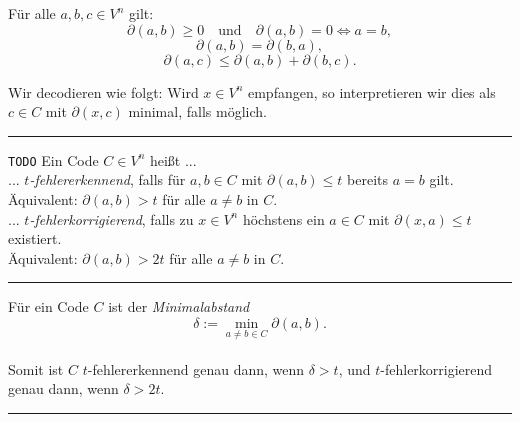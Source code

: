 \documentclass[9pt]{article}
\begin{document}
\begin{eig}
Für alle \(a, b, c \in V^n\) gilt: 
\[
\partial(a, b) \geq 0 \quad \text{und} \quad \partial(a, b) = 0 \iff a = b,
\]
\[
\partial(a, b) = \partial(b, a),
\]
\[
\partial(a, c) \leq \partial(a, b) + \partial(b, c).
\]

Wir decodieren wie folgt: Wird \(x \in V^n\) empfangen, so interpretieren wir dies als \(c \in C\) mit \(\partial(x, c)\) minimal, falls möglich. 
\end{eig} \noindent \rule{8cm}{0.4pt}

\begin{defi} \texttt{TODO} 
Ein Code \(C \in V^n\) heißt ... \\
... \emph{\(t\)-fehlererkennend}, falls für \(a, b \in C\) mit \(\partial(a, b) \leq t\) bereits \(a = b\) gilt. \\ Äquivalent: \(\partial(a, b) > t\) für alle \(a \neq b\) in \(C\). \\ \newline
... \emph{\(t\)-fehlerkorrigierend}, falls zu \(x \in V^n\) höchstens ein \(a \in C\) mit \(\partial(x, a) \leq t\)
existiert. \\Äquivalent: \(\partial(a, b) > 2t\) für alle \(a \neq b\) in \(C\).
\end{defi} \noindent \rule{8cm}{0.4pt}
   
\begin{defi}
Für ein Code \(C\) ist der \emph{Minimalabstand}
\[
\delta := \min_{a \neq b \in C} \partial(a, b).
\]
 \\
Somit ist \(C\) \(t\)-fehlererkennend genau dann, wenn \(\delta > t\), und \(t\)-fehlerkorrigierend genau dann, wenn \(\delta > 2t\).
\end{defi} \noindent \rule{8cm}{0.4pt}
\end{document}
